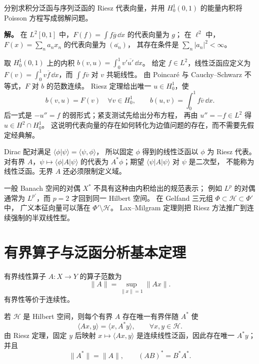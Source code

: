\begin{example}
分别求积分泛函与序列泛函的 Riesz 代表向量，并用 $H_0^1(0,1)$ 的能量内积将 Poisson 方程写成弱解问题。

\textbf{解。} 在 $L^2[0,1]$ 中，$F(f)=\int f\overline g\,\dd x$ 的代表向量为 $g$；
在 $\ell^2$ 中，$F(x)=\sum_n a_nx_n$ 的代表向量为 $(\overline{a_n})$，
其存在条件是 $\sum_n|a_n|^2<\infty$。

取 $H_0^1(0,1)$ 上的内积
$b(v,u)=\int_0^1 v'\overline{u'}\,\dd x$。
给定 $f\in L^2$，线性泛函应定义为
$F(v)=\int_0^1v\overline f\,\dd x$，而 $\int f\overline v$ 对 $v$ 共轭线性。
由 Poincaré 与 Cauchy--Schwarz 不等式，$F$ 对 $b$ 的范数连续。
Riesz 定理给出唯一 $u\in H_0^1$，使
\[
b(v,u)=F(v)\quad\forall v\in H_0^1,
\qquad
b(u,v)=\int_0^1 f\overline v\,\dd x.
\]
后一式是 $-u''=f$ 的弱形式；紧支测试先给出分布方程，
再由 $u''=-f\in L^2$ 得 $u\in H^2\cap H_0^1$。
这说明代表向量的存在如何转化为边值问题的存在，而不需要先假定经典解。
\end{example}

\begin{note}
Dirac 配对满足 $\langle\phi|\psi\rangle=\langle\psi,\phi\rangle$，
所以固定 $\phi$ 得到的线性泛函以 $\phi$ 为 Riesz 代表。
对有界 $A$，$\psi\mapsto\langle\phi|A|\psi\rangle$
的代表为 $A^*\phi$；期望 $\langle\psi|A|\psi\rangle$ 对 $\psi$ 是二次型，
不能称为线性泛函。无界 $A$ 还必须限制定义域。

一般 Banach 空间的对偶 $X^*$ 不具有这种由内积给出的规范表示；
例如 $L^p$ 的对偶通常为 $L^{p'}$，而 $p=2$ 才回到同一 Hilbert 空间。
在 Gelfand 三元组 $\Phi\subset\mathcal H\subset\Phi'$ 中，
广义本征向量可以落在 $\Phi'\setminus\mathcal H$。
Lax--Milgram 定理则把 Riesz 方法推广到连续强制的半双线性型。
\end{note}

\section{有界算子与泛函分析基本定理}
\begin{definition}[有界算子与算子范数]
有界线性算子 $A:X\to Y$ 的算子范数为
\[
\|A\|=\sup_{\|x\|=1}\|Ax\|.
\]
有界性等价于连续性。
\end{definition}

\begin{proposition}[有界算子的伴随]
若 $\mathcal H$ 是 Hilbert 空间，则每个有界 $A$ 存在唯一有界伴随 $A^*$ 使
\[
{\langle Ax,y\rangle=\langle x,A^*y\rangle},
\qquad \forall x,y\in\mathcal H.
\]
由 Riesz 定理，固定 $y$ 后映射 $x\mapsto\langle Ax,y\rangle$ 是连续线性泛函，因此存在唯一 $A^*y$；并且
\[
\|A^*\|=\|A\|,
\qquad
(AB)^*=B^*A^*.
\]
\end{proposition}

